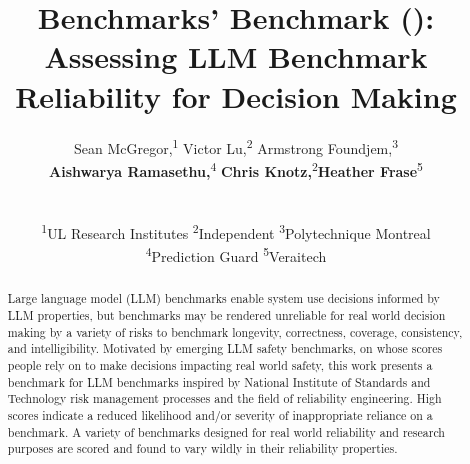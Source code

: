 \documentclass{article}
\title{Benchmarks' Benchmark (\texorpdfstring{\bb}{B2}): Assessing LLM Benchmark Reliability for Decision Making}
\author{%
  Sean McGregor,\textsuperscript{1}
  Victor Lu,\textsuperscript{2}
  Armstrong Foundjem,\textsuperscript{3}\\
  \textbf{Aishwarya Ramasethu,}\textsuperscript{4}
  \textbf{Chris Knotz,}\textsuperscript{2}\textbf{Heather Frase}\textsuperscript{5}\\
   \\
  \\
  \textsuperscript{1}UL Research Institutes \textsuperscript{2}Independent
\textsuperscript{3}Polytechnique Montreal
\\
\textsuperscript{4}Prediction Guard
\textsuperscript{5}Veraitech
}
\begin{document}
\maketitle

\begin{abstract}
Large language model (LLM) benchmarks enable system use decisions informed by LLM properties, but benchmarks may be rendered unreliable for real world decision making by a variety of risks to benchmark longevity, correctness, coverage, consistency, and intelligibility. Motivated by emerging LLM safety benchmarks, on whose scores people rely on to make decisions impacting real world safety, this work presents a benchmark for LLM benchmarks inspired by National Institute of Standards and Technology risk management processes and the field of reliability engineering. High scores indicate a reduced likelihood and/or severity of inappropriate reliance on a benchmark. A variety of benchmarks designed for real world reliability and research purposes are scored and found to vary wildly in their reliability properties.
\end{abstract}





\end{document}
